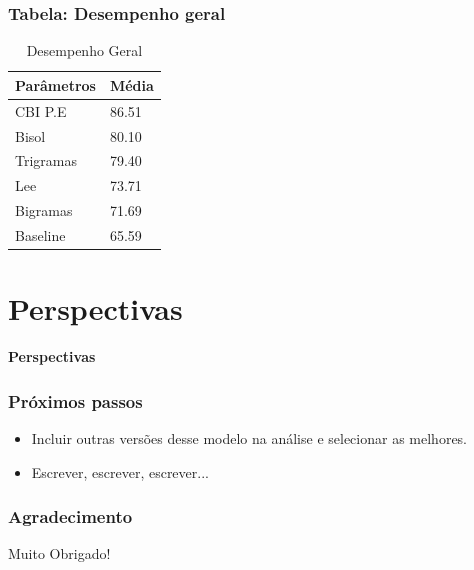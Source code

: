\documentclass[xcolor=table]{beamer}
\begin{document}
	\begin{frame}
		\frametitle{Tabela: Desempenho geral}
		\begin{table}[]
			\centering
			\caption{Desempenho Geral}
			\label{my-label}
			\begin{tabular}{@{}ll@{}}
				\toprule
				Parâmetros & Média \\ \midrule
				CBI P.E    & 86.51 \\
				Bisol      & 80.10 \\
				Trigramas  & 79.40 \\
				Lee        & 73.71 \\
				Bigramas   & 71.69 \\
				Baseline   & 65.59 \\ \bottomrule
			\end{tabular}
		\end{table}
	\end{frame}
	
	\section{Perspectivas}
		\begin{frame}
			\centering \textbf{Perspectivas}
		\end{frame}
	\begin{frame}
		\frametitle{Próximos passos}
		\begin{itemize}
			\item Incluir outras versões desse modelo na análise e selecionar as melhores.\\
			\item Escrever, escrever, escrever...\\
		\end{itemize}
	\end{frame}
	\begin{frame}
		\frametitle{Agradecimento}
		Muito Obrigado!
		
	\end{frame}
\end{document}

